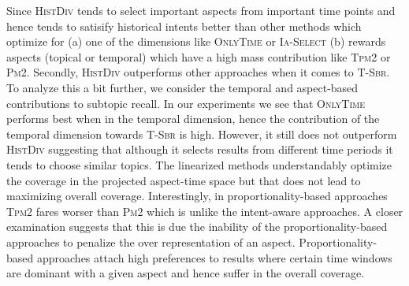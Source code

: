 Since \textsc{HistDiv} tends to select important aspects from important time points and hence tends to satisify historical intents better than other methods which optimize for (a) one of the dimensions like \textsc{OnlyTime} or \textsc{Ia-Select} (b) rewards aspects (topical or temporal) which have a high mass contribution like \textsc{Tpm2} or \textsc{Pm2}. 
Secondly, \textsc{HistDiv} outperforms other approaches when it comes to \textsc{T-Sbr}. To analyze this a bit further, we consider the temporal and aspect-based contributions to subtopic recall. In our experiments we see that \textsc{OnlyTime} performs best when in the temporal dimension, hence the contribution of the temporal dimension towards \textsc{T-Sbr} is high. However, it still does not outperform \textsc{HistDiv} suggesting that although it selects results from different time periods it tends to choose similar topics. The linearized methods understandably optimize the coverage in the projected aspect-time space but that does not lead to maximizing overall coverage. Interestingly, in proportionality-based approaches \textsc{Tpm2} fares worser than \textsc{Pm2} which is unlike the intent-aware approaches. A closer examination suggests that this is due the inability of the proportionality-based approaches to penalize the over representation of an aspect. Proportionality-based approaches attach high preferences to results where certain time windows are dominant with a given aspect and hence suffer in the overall coverage.

 
\begin{table}[!t]
\small
\centering
{}
 \caption{Results for \texttt{Rudolph Giuliani} - \emph{LM}}
 \label{tab:qual}
\end{table}

